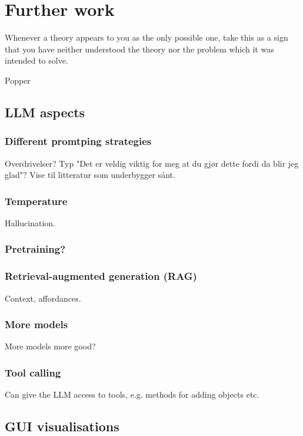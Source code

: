 \chapter{Further work}\label{sec:furtherWork}

\epigraph{Whenever a theory appears to you as the only possible one, take this as a sign that you have neither understood the theory nor the problem which it was intended to solve.}{Popper}

\section{LLM aspects}

\subsection{Different promtping strategies}

Overdrivelser? Typ "Det er veldig viktig for meg at du gjør dette fordi da blir
jeg glad"? Vise til litteratur som underbygger sånt.

\subsection{Temperature}
Hallucination.

\subsection{Pretraining?}

\subsection{Retrieval-augmented generation (RAG)}
Context, affordances.

\subsection{More models}

More models more good?

\subsection{Tool calling}

Can give the LLM access to tools, e.g. methods for adding objects etc.

\section{GUI visualisations}


